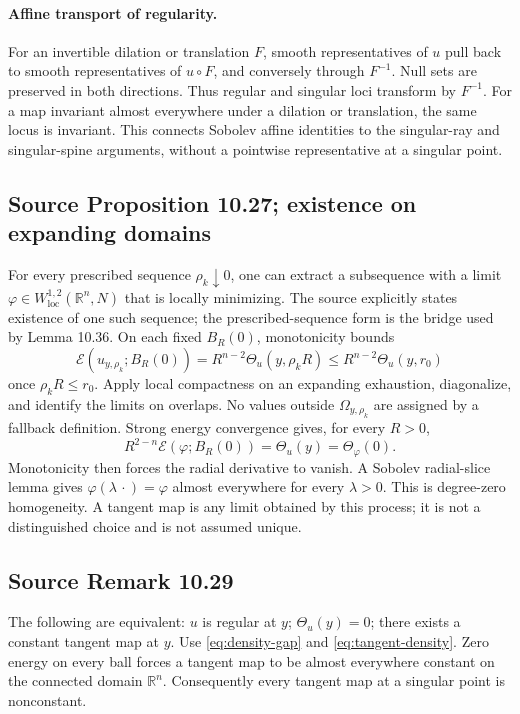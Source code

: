 \documentclass[11pt,a4paper]{article}
\numberwithin{equation}{section}
\theoremstyle{definition}
\theoremstyle{remark}
\newcommand{\R}{\mathbb R}
\newcommand{\E}{\mathcal E}
\newcommand{\Th}{\Theta}
\newcommand{\loc}{\mathrm{loc}}
\begin{document}
\paragraph{Affine transport of regularity.}\label{lem:affine-regularity}
For an invertible dilation or translation $F$, smooth representatives of
$u$ pull back to smooth representatives of $u\circ F$, and conversely
through $F^{-1}$. Null sets are preserved in both directions.
Thus regular and singular loci transform by $F^{-1}$. For a map invariant
almost everywhere under a dilation or translation, the same locus is
invariant. This connects Sobolev affine identities to the singular-ray
and singular-spine arguments, without a pointwise representative at a
singular point.

\subsection{Source Proposition 10.27; existence on expanding domains}
\label{prop:tangent-existence}
For every prescribed sequence $\rho_k\downarrow0$, one can extract a
subsequence with a limit $\varphi\in W^{1,2}_{\loc}(\R^n,N)$ that is
locally minimizing. The source explicitly states existence of one such
sequence; the prescribed-sequence form is the bridge used by Lemma 10.36.
On each fixed $B_R(0)$, monotonicity bounds
\[
 \E(u_{y,\rho_k};B_R(0))=R^{n-2}\Th_u(y,\rho_kR)
 \le R^{n-2}\Th_u(y,r_0)
\]
once $\rho_kR\le r_0$. Apply local compactness on an expanding exhaustion,
diagonalize, and identify the limits on overlaps. No values outside
$\Omega_{y,\rho_k}$ are assigned by a fallback definition.
Strong energy convergence gives, for every $R>0$,
\begin{equation}\label{eq:tangent-density}
 R^{2-n}\E(\varphi;B_R(0))=\Th_u(y)=\Th_\varphi(0).
\end{equation}
Monotonicity then forces the radial derivative to vanish. A Sobolev
radial-slice lemma gives
$\varphi(\lambda\,\cdot)=\varphi$ almost everywhere for every $\lambda>0$.
This is degree-zero homogeneity. A tangent map is any limit obtained by
this process; it is not a distinguished choice and is not assumed unique.

\subsection{Source Remark 10.29}\label{prop:tangent-regularity}
The following are equivalent: $u$ is regular at $y$; $\Th_u(y)=0$;
there exists a constant tangent map at $y$. Use
\eqref{eq:density-gap} and \eqref{eq:tangent-density}. Zero energy on
every ball forces a tangent map to be almost everywhere constant on the
connected domain $\R^n$. Consequently every tangent map at a singular
point is nonconstant.
\end{document}
